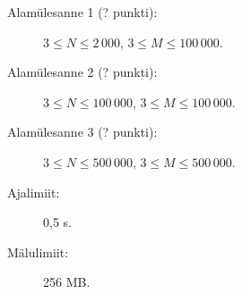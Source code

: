 ﻿\documentclass{boi2014-et}
\begin{document}
    \Scoring

    \begin{description}
        \item[Alamülesanne 1 (? punkti):] $3 \le N \le 2\,000$, $3 \le M \le 100\,000$.
        \item[Alamülesanne 2 (? punkti):] $3 \le N \le 100\,000$, $3 \le M \le 100\,000$.
        \item[Alamülesanne 3 (? punkti):] $3 \le N \le 500\,000$, $3 \le M \le 500\,000$.
    \end{description}

    \Constraints

    \begin{description}
        \item[Ajalimiit:] 0,5 s.
        \item[Mälulimiit:] 256 MB.
    \end{description}
\end{document}
